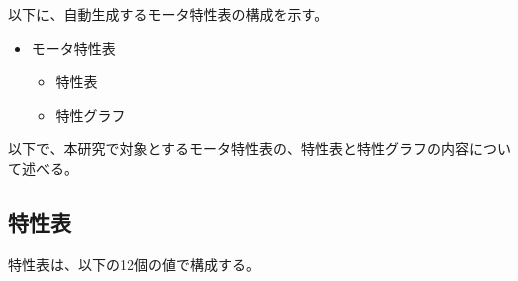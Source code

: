 以下に、自動生成するモータ特性表の構成を示す。
\begin{itemize}
	\item モータ特性表
	\begin{itemize}
		\item 特性表
		\item 特性グラフ
	\end{itemize}
\end{itemize}
以下で、本研究で対象とするモータ特性表の、特性表と特性グラフの内容について述べる。
\subsection{特性表}\label{sub:tokuseihyou}
特性表は、以下の12個の値で構成する。
